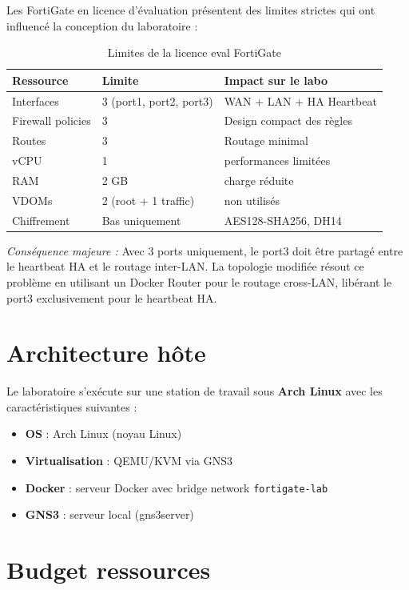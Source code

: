 Les FortiGate en licence d'évaluation présentent des limites strictes qui ont influencé la conception du laboratoire :

\begin{table}[H]
\centering
\caption{Limites de la licence eval FortiGate}
\label{tab:eval-limits}
\begin{tabularx}{\textwidth}{|l|l|X|}
\hline
\textbf{Ressource} & \textbf{Limite} & \textbf{Impact sur le labo} \\
\hline
Interfaces & 3 (port1, port2, port3) & WAN + LAN + HA Heartbeat \\
\hline
Firewall policies & 3 & Design compact des règles \\
\hline
Routes & 3 & Routage minimal \\
\hline
vCPU & 1 & performances limitées \\
\hline
RAM & 2 GB & charge réduite \\
\hline
VDOMs & 2 (root + 1 traffic) & non utilisés \\
\hline
Chiffrement & Bas uniquement & AES128-SHA256, DH14 \\
\hline
\end{tabularx}
\end{table}

\noindent\textit{Conséquence majeure :} Avec 3 ports uniquement, le port3 doit être partagé entre le heartbeat HA et le routage inter-LAN. La topologie modifiée résout ce problème en utilisant un Docker Router pour le routage cross-LAN, libérant le port3 exclusivement pour le heartbeat HA.

\section{Architecture hôte}

Le laboratoire s'exécute sur une station de travail sous \textbf{Arch Linux} avec les caractéristiques suivantes :

\begin{itemize}
    \item \textbf{OS} : Arch Linux (noyau Linux)
    \item \textbf{Virtualisation} : QEMU/KVM via GNS3
    \item \textbf{Docker} : serveur Docker avec bridge network \texttt{fortigate-lab}
    \item \textbf{GNS3} : serveur local (gns3server)
\end{itemize}

\section{Budget ressources}

